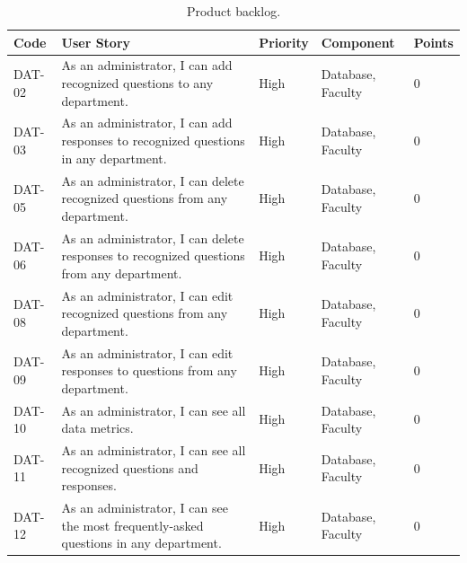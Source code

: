 \documentclass[titlepage, 12pt]{article}
\begin{document}
\begin{center}

        \begin{longtable}{ L{1.5cm} L{4cm} L{1.5cm} L{3cm} L{1.5cm} }
        \caption{Product backlog.} \\
        \toprule
        \textbf{Code} & \textbf{User Story} & \textbf{Priority} & \textbf{Component} & \textbf{Points} \\
        \toprule
        \endhead
        DAT-02 & As an administrator, I can add recognized questions to any department.                                                            & High   & Database, Faculty   & 0           \\
        \midrule
        DAT-03 & As an administrator, I can add responses to recognized questions in any department.                                               & High   & Database, Faculty   & 0           \\
        \midrule
        DAT-05 & As an administrator, I can delete recognized questions from any department.                                                       & High   & Database, Faculty    & 0          \\
        \midrule
        DAT-06 & As an administrator, I can delete responses to recognized questions from any department.                                          & High   & Database, Faculty    & 0          \\
        \midrule
        DAT-08 & As an administrator, I can edit recognized questions from any department.                                                         & High   & Database, Faculty    & 0          \\
        \midrule
        DAT-09 & As an administrator, I can edit responses to questions from any department.                                                       & High   & Database, Faculty    & 0        \\
        \midrule
        DAT-10 & As an administrator, I can see all data metrics.                                                                                  & High   & Database, Faculty    & 0           \\
        \midrule
        DAT-11 & As an administrator, I can see all recognized questions and responses.                                                            & High   & Database, Faculty    & 0         \\
        \midrule
        DAT-12 & As an administrator, I can see the most frequently-asked questions in any department.                                             & High   & Database, Faculty    & 0           \\

\end{longtable}
\end{center}
\end{document}
